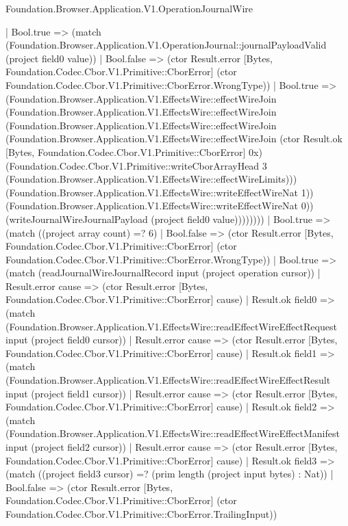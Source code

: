 \begin{lexlean}{Foundation.Browser.Application.V1.OperationJournalWire}
\begin{semanticmodule}
{                              | Bool.true => (match (Foundation.Browser.Application.V1.OperationJournal::journalPayloadValid (project field0 value))
                                | Bool.false => (ctor Result.error [Bytes, Foundation.Codec.Cbor.V1.Primitive::CborError] (ctor Foundation.Codec.Cbor.V1.Primitive::CborError.WrongType))
                                | Bool.true => (Foundation.Browser.Application.V1.EffectsWire::effectWireJoin (Foundation.Browser.Application.V1.EffectsWire::effectWireJoin (Foundation.Browser.Application.V1.EffectsWire::effectWireJoin (Foundation.Browser.Application.V1.EffectsWire::effectWireJoin (ctor Result.ok [Bytes, Foundation.Codec.Cbor.V1.Primitive::CborError] 0x) (Foundation.Codec.Cbor.V1.Primitive::writeCborArrayHead 3 (Foundation.Browser.Application.V1.EffectsWire::effectWireLimits))) (Foundation.Browser.Application.V1.EffectsWire::writeEffectWireNat 1)) (Foundation.Browser.Application.V1.EffectsWire::writeEffectWireNat 0)) (writeJournalWireJournalPayload (project field0 value))))))))
                      | Bool.true => (match ((project array count) =? 6)
                        | Bool.false => (ctor Result.error [Bytes, Foundation.Codec.Cbor.V1.Primitive::CborError] (ctor Foundation.Codec.Cbor.V1.Primitive::CborError.WrongType))
                        | Bool.true => (match (readJournalWireJournalRecord input (project operation cursor))
                          | Result.error cause => (ctor Result.error [Bytes, Foundation.Codec.Cbor.V1.Primitive::CborError] cause)
                          | Result.ok field0 => (match (Foundation.Browser.Application.V1.EffectsWire::readEffectWireEffectRequest input (project field0 cursor))
                            | Result.error cause => (ctor Result.error [Bytes, Foundation.Codec.Cbor.V1.Primitive::CborError] cause)
                            | Result.ok field1 => (match (Foundation.Browser.Application.V1.EffectsWire::readEffectWireEffectResult input (project field1 cursor))
                              | Result.error cause => (ctor Result.error [Bytes, Foundation.Codec.Cbor.V1.Primitive::CborError] cause)
                              | Result.ok field2 => (match (Foundation.Browser.Application.V1.EffectsWire::readEffectWireEffectManifest input (project field2 cursor))
                                | Result.error cause => (ctor Result.error [Bytes, Foundation.Codec.Cbor.V1.Primitive::CborError] cause)
                                | Result.ok field3 => (match ((project field3 cursor) =? (prim length (project input bytes) : Nat))
                                  | Bool.false => (ctor Result.error [Bytes, Foundation.Codec.Cbor.V1.Primitive::CborError] (ctor Foundation.Codec.Cbor.V1.Primitive::CborError.TrailingInput))
}
\end{semanticmodule}
\end{lexlean}
